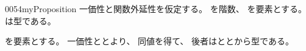 \documentclass[index]{subfiles}
\begin{document}
\begin{myBlock}{0054}{myProposition}
  一価性と関数外延性を仮定する。
  を階数、
  を要素とする。
  は型である。
\end{myBlock}
\begin{myProof}
  を要素とする。
  一価性ととより、
  同値を得て、
  後者はととから型である。
\end{myProof}
\end{document}
